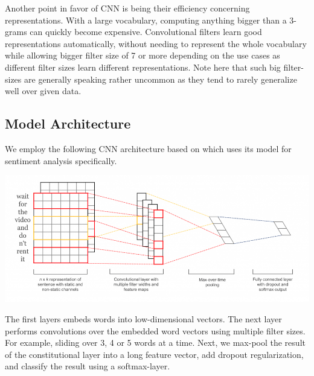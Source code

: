 \documentclass[10pt, oneside]{article}
\newenvironment{Figure}
	{\par\medskip\noindent\minipage{\linewidth}}
	{\endminipage\par\medskip}
\begin{document}
\begin{multicols}{2}
Another point in favor of CNN is being their efficiency concerning representations.  With a large vocabulary, computing anything bigger than a 3-grams can quickly become expensive.  Convolutional filters learn good representations automatically, without needing to represent the whole vocabulary while allowing bigger filter size of 7 or more depending on the use cases as different filter sizes learn different representations. Note here that such big filter-sizes are generally speaking rather uncommon as they tend to rarely generalize well over given data.

\subsection{Model Architecture}

We employ the following CNN architecture based on \cite{Kim2014} which uses its model for sentiment analysis specifically.

\begin{Figure}
	\centering
	\includegraphics[width=\linewidth]{images/cnn_architecture1.png}
\end{Figure}


The first layers embeds words into low-dimensional vectors. The next layer performs convolutions over the embedded word vectors using multiple filter sizes. For example, sliding over 3, 4 or 5 words at a time. Next, we max-pool the result of the constitutional layer into a long feature vector, add dropout regularization, and classify the result using a softmax-layer.


\end{multicols}
\end{document}
